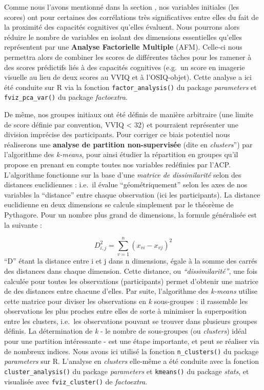 \documentclass[
  12pt,
]{article}
\begin{document}
Comme nous l'avons mentionné dans la section
\emph{}, nos variables initiales (les scores) ont
pour certaines des corrélations très significatives entre elles du fait
de la proximité des capacités cognitives qu'elles évaluent. Nous
pourrons alors réduire le nombre de variables en isolant des dimensions
essentielles qu'elles représentent par une \textbf{Analyse Factorielle
Multiple} (AFM). Celle-ci nous permettra alors de combiner les scores de
différentes tâches pour les ramener à des scores prédictifs liés à des
capacités cognitives (e.g.~un score en imagerie visuelle au lieu de deux
scores au VVIQ et à l'OSIQ-objet). Cette analyse a ici été conduite sur
R via la fonction \texttt{factor\_analysis()} du package
\emph{parameters} et \texttt{fviz\_pca\_var()} du package
\emph{factoextra}.

De même, nos groupes initiaux ont été définis de manière arbitraire (une
limite de score définie par convention, VVIQ \textless{} 32) et
pourraient représenter une division imprécise des participants. Pour
corriger ce biais potentiel nous réaliserons une \textbf{analyse de
partition non-supervisée} (dite en \emph{clusters}'') par l'algorithme
des \emph{k-means}, pour ainsi étudier la répartition en groupes qu'il
propose en prenant en compte toutes nos variables redéfinies par l'ACP.
L'algorithme fonctionne sur la base d'une \emph{matrice de
dissimilarité} selon des distances euclidiennes : i.e.~il évalue
``géométriquement'' selon les axes de nos variables la ``distance''
entre chaque observation (ici les participants). La distance euclidienne
en deux dimensions se calcule simplement par le théorème de Pythagore.
Pour un nombre plus grand de dimensions, la formule généralisée est la
suivante :

\[
D_{i,j}^2 = \sum_{v=1}^{n}(x_{vi}-x_{vj})^2
\] ``D'' étant la distance entre i et j dans n dimensions, égale à la
somme des carrés des distances dans chaque dimension. Cette distance, ou
\emph{``dissimilarité''}, une fois calculée pour toutes les observations
(participants) permet d'obtenir une matrice de des distances entre
chacune d'elles. Par suite, l'algorithme des \emph{k-means} utilise
cette matrice pour diviser les observations en \emph{k} sous-groupes :
il rassemble les observations les plus proches entre elles de sorte à
minimiser la superposition entre les clusters, i.e.~les observations
pouvant se trouver dans plusieurs groupes définis. La détermination de
\emph{k} - le nombre de sous-groupes (ou \emph{clusters}) idéal pour une
partition intéressante - est une étape importante, et peut se réaliser
via de nombreux indices. Nous avons ici utilisé la fonction
\texttt{n\_clusters()} du package \emph{parameters} sur R. L'analyse en
\emph{clusters} elle-même a été conduite avec la fonction
\texttt{cluster\_analysis()} du package \emph{parameters} et
\texttt{kmeans()} du package \emph{stats}, et visualisée avec
\texttt{fviz\_cluster()} de \emph{factoextra}.
\end{document}
